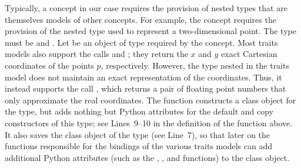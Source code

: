 Typically, a concept in our case requires the provision of nested types that are themselves models of other concepts. For example, the concept  requires the provision of the nested type  used to represent a two-dimensional point. The type  must be  and . Let  be an object of type   required by the  concept. Most traits models also support the calls  and ; they return the $x$ and $y$ exact Cartesian coordinates of the points $p$, respectively. However, the  type nested in the traits model  does not maintain an exact representation of the coordinates. Thus, it instead supports the call , which returns a pair of floating point numbers that only approximate the real coordinates. The function  constructs a class object for the  type, but adds nothing but Python attributes for the default and copy constructors of this type; see Lines~9--10 in the definition of the function  above. It also saves the class object of the  type (see Line~7), so that later on the functions responsible for the bindings of the various traits models can add additional Python attributes (such as the , , and  functions) to the class object.

